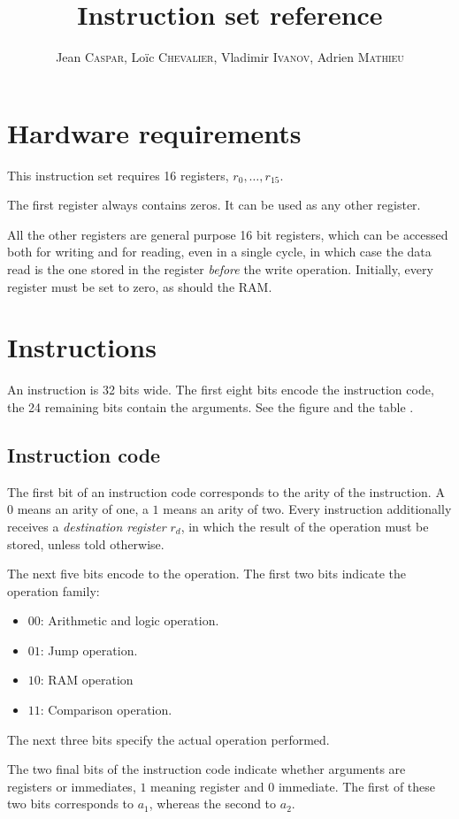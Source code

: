 \documentclass{scrartcl}
\title{Instruction set reference}
\author{%
  Jean \textsc{Caspar},
  Loïc \textsc{Chevalier},
  Vladimir \textsc{Ivanov},
  Adrien \textsc{Mathieu}
}
\date{}
\begin{document}
\maketitle{}
\section*{Hardware requirements}
This instruction set requires 16 registers, \(r_0,\ldots,r_{15}\).\par
The first register always contains zeros. It can be used as any other register.\par
All the other registers are general purpose 16 bit registers, which can be
accessed both for writing and for reading, even in a single cycle, in which case
the data read is the one stored in the register \textit{before} the write
operation. Initially, every register must be set to zero, as should the
RAM.

\section*{Instructions}
An instruction is 32 bits wide. The first eight bits encode the
instruction code, the 24 remaining bits contain the arguments. See
the figure  and the table .
\subsection*{Instruction code}
The first bit of an instruction code corresponds to the arity of the instruction.
A $0$ means an arity of one, a $1$ means an arity of two. Every instruction
additionally receives a \emph{destination register} $r_d$, in which the result of
the operation must be stored, unless told otherwise.\par
The next five bits encode to the operation. The first two bits indicate the
operation family:
\begin{itemize}
\item $00$: Arithmetic and logic operation.
\item $01$: Jump operation.
\item $10$: RAM operation
\item $11$: Comparison operation.
\end{itemize}
The next three bits specify the actual operation performed.\par
The two final bits of the instruction code indicate whether arguments are
registers or immediates, $1$ meaning register and $0$ immediate. The first of
these two bits corresponds to $a_1$, whereas the second to $a_2$.
\end{document}
